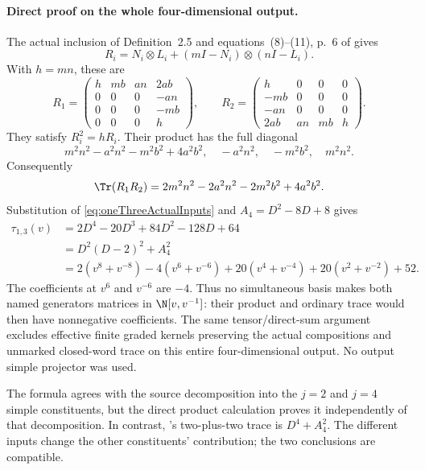 \paragraph{Direct proof on the whole four-dimensional output.}
The actual inclusion of Definition~2.5 and
equations~(8)--(11), p.~6 of
\cite{BlasiakChebyshev} gives
\[
 R_i=N_i\otimes L_i+(mI-N_i)\otimes(nI-L_i).
\]
With \(h=mn\), these are
\begin{equation}\label{eq:oneThreeFullMatrices}
 R_1=\begin{pmatrix}
 h&mb&an&2ab\\0&0&0&-an\\0&0&0&-mb\\0&0&0&h
 \end{pmatrix},\qquad
 R_2=\begin{pmatrix}
 h&0&0&0\\-mb&0&0&0\\-an&0&0&0\\2ab&an&mb&h
 \end{pmatrix}.
\end{equation}
They satisfy \(R_i^2=hR_i\).
Their product has the full diagonal
\[
 m^2n^2-a^2n^2-m^2b^2+4a^2b^2,\quad
        -a^2n^2,\quad -m^2b^2,\quad m^2n^2.
\]
Consequently
\[
 \Tr(R_1R_2)=2m^2n^2-2a^2n^2-2m^2b^2+4a^2b^2.
\]
Substitution of \eqref{eq:oneThreeActualInputs}
and \(A_4=D^2-8D+8\) gives
\begin{equation}\label{eq:oneThreeNegativeTrace}
\begin{split}
 \tau_{1,3}(v)
 &=2D^4-20D^3+84D^2-128D+64\\
 &=D^2(D-2)^2+A_4^2\\
 &=2(v^8+v^{-8})-4(v^6+v^{-6})
       +20(v^4+v^{-4})+20(v^2+v^{-2})+52.
\end{split}
\end{equation}
The coefficients at \(v^{6}\) and \(v^{-6}\)
are \(-4\). Thus no simultaneous basis makes
both named generators matrices in
\(\N[v,v^{-1}]\): their product and ordinary
trace would then have nonnegative coefficients.
The same tensor/direct-sum argument excludes
effective finite graded kernels preserving
the actual compositions and unmarked closed-word
trace on this entire four-dimensional output.
No output simple projector was used.

The formula agrees with the source decomposition
into the \(j=2\) and \(j=4\) simple constituents,
but the direct product calculation proves it
independently of that decomposition.
In contrast, 's two-plus-two trace
is \(D^4+A_4^2\).
The different inputs change the other constituents'
contribution; the two conclusions are compatible.

